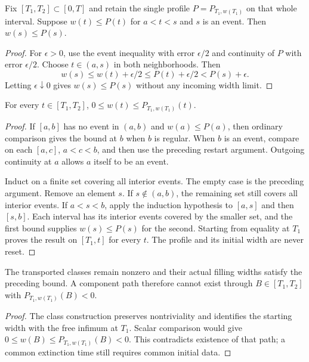 \begin{lemma}
\label{lem:v4-event-restart}
Fix $[T_1,T_2]\subset[0,T]$ and retain the single profile
$P=P_{T_1,w(T_1)}$ on that whole interval. Suppose $w(t)\leq P(t)$
for $a<t<s$ and $s$ is an event. Then $w(s)\leq P(s)$.
\end{lemma}
\begin{proof}
For $\epsilon>0$, use the event
inequality with error $\epsilon/2$ and continuity of $P$ with error
$\epsilon/2$. Choose $t\in(a,s)$ in both neighborhoods. Then
\[
 w(s)\leq w(t)+\epsilon/2\leq P(t)+\epsilon/2<P(s)+\epsilon.
\]
Letting $\epsilon\downarrow0$ gives $w(s)\leq P(s)$ without any
incoming width limit.
\end{proof}

\begin{proposition}
\label{prop:v4-scalar-clock}
For every $t\in[T_1,T_2]$, $0\leq w(t)\leq P_{T_1,w(T_1)}(t)$.
\end{proposition}
\begin{proof}
If $[a,b]$ has no event in $(a,b)$ and $w(a)\leq P(a)$, then
ordinary comparison gives the bound at $b$ when $b$ is regular.
When $b$ is an event, compare on each $[a,c]$, $a<c<b$, and then
use the preceding restart argument. Outgoing continuity at $a$ allows
$a$ itself to be an event.

Induct on a finite set covering all interior events. The empty case is
the preceding argument. Remove an element $s$. If $s\notin(a,b)$,
the remaining set still covers all interior events. If $a<s<b$, apply
the induction hypothesis to $[a,s]$ and then $[s,b]$. Each interval
has its interior events covered by the smaller set, and the first bound
supplies $w(s)\leq P(s)$ for the second. Starting from equality at
$T_1$ proves the result on $[T_1,t]$ for every $t$. The profile and
its initial width are never reset.
\end{proof}

\begin{proposition}
\label{prop:v4-finite-piece}
\label{prop:v4-component-contradiction}
The transported classes remain nonzero and their actual filling widths
satisfy the preceding bound. A component path therefore cannot exist
through $B\in[T_1,T_2]$ with $P_{T_1,w(T_1)}(B)<0$.
\end{proposition}
\begin{proof}
The class construction preserves nontriviality and identifies the starting
width with the free infimum at $T_1$. Scalar comparison would give
$0\leq w(B)\leq P_{T_1,w(T_1)}(B)<0$. This contradicts existence
of that path; a common extinction time still requires common initial data.
\end{proof}

